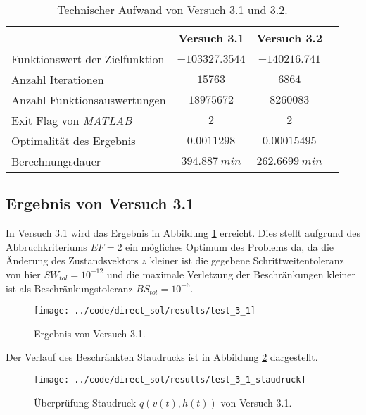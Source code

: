 \begin{table}[H]
    \centering
    \caption{Technischer Aufwand von Versuch 3.1 und 3.2.}\label{tab:Versuch3_TA}
    \begin{tabularx}{.9\textwidth}{Zccc}
        \toprule
         & \textbf{Versuch 3.1} & \textbf{Versuch 3.2} \\
        \midrule
        Funktionswert der Zielfunktion & $-103327.3544$ & $-140216.741$ \\
        Anzahl Iterationen & $15763$ & $6864$ \\
        Anzahl Funktionsauswertungen & $18975672$ & $8260083$ \\
        Exit Flag von \textit{MATLAB} & $2$ & $2$ \\
        Optimalität des Ergebnis & $0.0011298$ & $0.00015495$ \\
        Berechnungsdauer & $394.887 \ min$ & $262.6699 \ min$ \\
        \bottomrule
    \end{tabularx}
\end{table}





\subsection{Ergebnis von Versuch 3.1}\label{kap:Versuch31}
In Versuch 3.1 wird das Ergebnis in Abbildung \ref{img:test_3_1} erreicht. Dies stellt aufgrund des Abbruchkriteriums $EF = 2$ ein mögliches Optimum des Problems da, da die Änderung des Zustandsvektors $z$ kleiner ist die gegebene Schrittweitentoleranz von hier $SW_{tol} = 10^{-12}$ und die maximale Verletzung der Beschränkungen kleiner ist als Beschränkungstoleranz $BS_{tol} = 10^{-6}$.
\begin{figure}[H]
\begin{center}
\texttt{[image: ../code/direct\_sol/results/test\_3\_1]}
\caption{Ergebnis von Versuch 3.1.}\label{img:test_3_1}
\end{center}
\end{figure}
Der Verlauf des Beschränkten Staudrucks ist in Abbildung \ref{img:test_3_1_staudruck} dargestellt.
\begin{figure}[H]
\begin{center}
\texttt{[image: ../code/direct\_sol/results/test\_3\_1\_staudruck]}
\caption{Überprüfung Staudruck $q(v(t),h(t))$ von Versuch 3.1.}\label{img:test_3_1_staudruck}
\end{center}
\end{figure}




